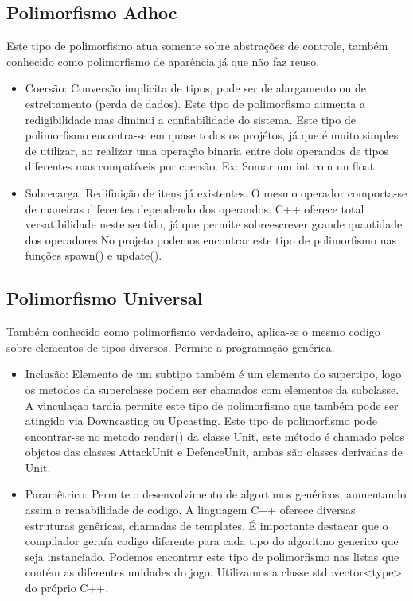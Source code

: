 \documentclass[rel_mlp]{iiufrgs}
\begin{document}
\subsection{Polimorfismo Adhoc} 
Este tipo de polimorfismo atua somente sobre abstrações de controle, também conhecido como polimorfismo de aparência já que não faz reuso.
\bigbreak
{}
 \begin{itemize}
	\item{ Coersão:  Conversão implicita de tipos, pode ser de alargamento ou de estreitamento (perda de dados). Este tipo de polimorfismo aumenta a redigibilidade mas diminui a confiabilidade do sistema.
Este tipo de polimorfismo encontra-se em quase todos os projétos, já que é muito simples de utilizar, ao realizar uma operação binaria entre dois operandos de tipos diferentes mas compatíveis por coersão. Ex: Somar um int com un float.
}
\item Sobrecarga: Redifinição de itens já existentes. O mesmo operador comporta-se de maneiras diferentes dependendo dos operandos. C++ oferece total versatibilidade neste sentido, já que permite sobreescrever grande quantidade dos operadores.No projeto podemos encontrar este tipo de polimorfismo nas funções spawn() e update().
 \end{itemize}  	
 
\subsection{Polimorfismo Universal}
 Também conhecido como polimorfismo verdadeiro, aplica-se o mesmo codigo sobre elementos de tipos diversos. Permite a programação genérica.
  \begin{itemize}
	\item Inclusão: Elemento de um subtipo também é um elemento do supertipo, logo os metodos da superclasse podem ser chamados com elementos da subclasse. A vinculaçao tardia permite este tipo de polimorfismo que também pode ser atingido via Downcasting ou Upcasting. 
	Este tipo de polimorfismo pode encontrar-se no metodo render() da classe Unit, este método é chamado pelos objetos das classes AttackUnit e DefenceUnit, ambas são classes derivadas de Unit.
	\item Paramêtrico: Permite o desenvolvimento de algortimos genéricos, aumentando assim a reusabilidade de codigo. A linguagem C++ oferece diversas estruturas genêricas, chamadas de templates. É importante destacar que o compilador geraŕa codigo diferente para cada tipo do algoritmo generico  que seja instanciado. Podemos encontrar este tipo de polimorfismo nas listas que contém as diferentes unidades do jogo. Utilizamos a classe std::vector<type> do próprio C++. 
 \end{itemize}  	
\end{document}
